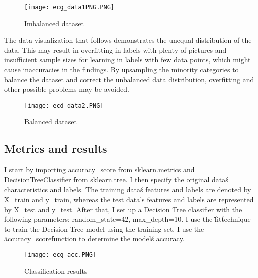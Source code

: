 \documentclass{article}
\begin{document}
\begin{multicols}{2}
\begin{figure} [H]
    \centering
    \texttt{[image: ecg\_data1PNG.PNG]}
    \caption{Imbalanced dataset}
    \label{fig:enter-label}
\end{figure}

The data visualization that follows demonstrates the unequal distribution of the data. This may result in overfitting in labels with plenty of pictures and insufficient sample sizes for learning in labels with few data points, which might cause inaccuracies in the findings.
By upsampling the minority categories to balance the dataset and correct the unbalanced data distribution, overfitting and other possible problems may be avoided.
\begin{figure} [H]
    \centering
    \texttt{[image: ecd\_data2.PNG]}
    \caption{Balanced dataset}
    \label{fig:enter-label}
\end{figure}
\subsection{Metrics and results}

I start by importing accuracy\_score from sklearn.metrics and DecisionTreeClassifier from sklearn.tree.
I then specify the original data\'s characteristics and labels. The training data\'s features and labels are denoted by X\_train and y\_train, whereas the test data's features and labels are represented by X\_test and y\_test. After that, I set up a Decision Tree classifier with the following parameters: random\_state=42, max\_depth=10. I use the \"fit\" technique to train the Decision Tree model using the training set. I use the \"accuracy\_score\" function to determine the model\'s accuracy.

\begin{figure}[H]
    \centering
    \texttt{[image: ecg\_acc.PNG]}
    \caption{Classification results}
    \label{fig:enter-label}
\end{figure}


\end{multicols}
\end{document}
